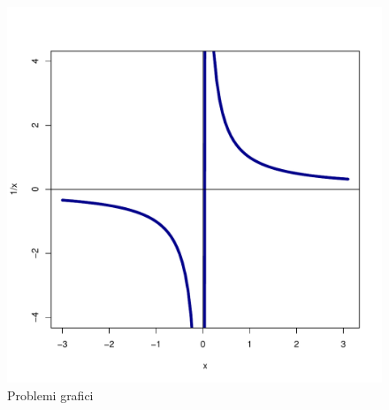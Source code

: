 \documentclass[onecolumn,11pt]{book}\usepackage[]{graphicx}\usepackage[]{color}
\makeatletter
\def\maxwidth{ %
  \ifdim\Gin@nat@width>\linewidth
    \linewidth
  \else
    \Gin@nat@width
  \fi
}
\newenvironment{knitrout}{}{} %
\makeatother
\begin{document}
\begin{itemize}
\begin{itemize}
\begin{figure}[ htbp]
\begin{center}
\begin{knitrout}
\color{fgcolor}
\includegraphics[width=\maxwidth]{figure/unnamed-chunk-90-1} 

\end{knitrout}
 \caption{Problemi grafici}
\label{assisb2}
\end{center}
\end{figure}


\end{itemize}
\end{itemize}
\end{document}
